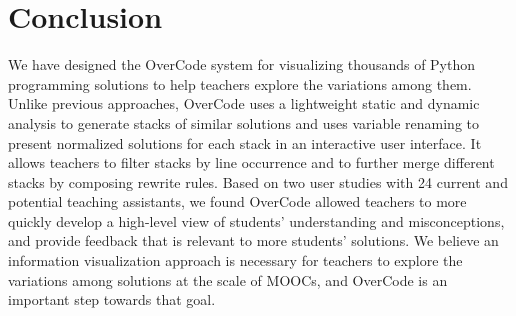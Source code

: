 \section{Conclusion}
We have designed the OverCode system for visualizing thousands of Python programming solutions to help teachers explore the variations among them. Unlike previous approaches, OverCode uses a lightweight static and dynamic analysis to generate stacks of similar solutions and uses variable renaming to present normalized solutions for each stack in an interactive user interface. It allows teachers to filter stacks by line occurrence and to further merge different stacks by composing rewrite rules. Based on two user studies with 24 current and potential teaching assistants, we found OverCode allowed teachers to more quickly develop a high-level view of students' understanding and misconceptions, and provide feedback that is relevant to more students' solutions. We believe an information visualization approach is necessary for teachers to explore the variations among solutions at the scale of MOOCs, and OverCode is an important step towards that goal.          
